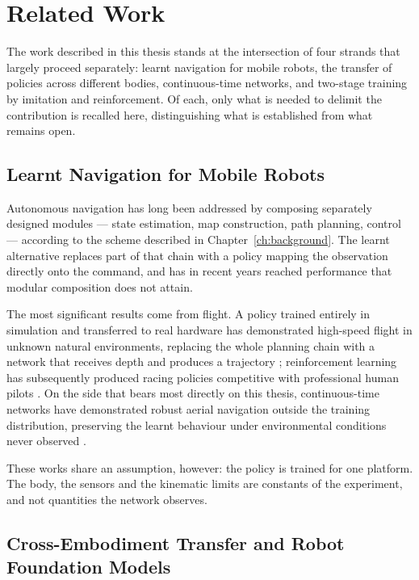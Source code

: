 \chapter{Related Work}
\label{ch:related}

The work described in this thesis stands at the intersection of four strands
that largely proceed separately: learnt navigation for mobile robots, the
transfer of policies across different bodies, continuous-time networks, and
two-stage training by imitation and reinforcement. Of each, only what is needed
to delimit the contribution is recalled here, distinguishing what is established
from what remains open.

\section{Learnt Navigation for Mobile Robots}
\label{sec:rel-navigation}

Autonomous navigation has long been addressed by composing separately designed
modules --- state estimation, map construction, path planning, control ---
according to the scheme described in Chapter~\ref{ch:background}. The learnt
alternative replaces part of that chain with a policy mapping the observation
directly onto the command, and has in recent years reached performance that
modular composition does not attain.

The most significant results come from flight. A policy trained entirely in
simulation and transferred to real hardware has demonstrated high-speed flight
in unknown natural environments, replacing the whole planning chain with a
network that receives depth and produces a trajectory
\cite{loquercio2021flight}; reinforcement learning has subsequently produced
racing policies competitive with professional human pilots
\cite{kaufmann2023racing}. On the side that bears most directly on this thesis,
continuous-time networks have demonstrated robust aerial navigation outside the
training distribution, preserving the learnt behaviour under environmental
conditions never observed \cite{chahine2023flight}.

These works share an assumption, however: the policy is trained for one
platform. The body, the sensors and the kinematic limits are constants of the
experiment, and not quantities the network observes.

\section{Cross-Embodiment Transfer and Robot Foundation Models}
\label{sec:rel-embodiment}

